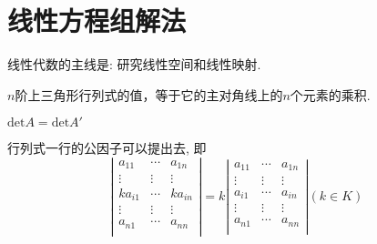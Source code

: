 \section{线性方程组解法}


\begin{Note}
线性代数的主线是: 研究线性空间和线性映射.
\end{Note}

\begin{Proposition}
$n$阶上三角形行列式的值，等于它的主对角线上的$n$个元素的乘积.
\end{Proposition}

\begin{Property}
$\mathrm{det}A = \mathrm{det}A'$
\end{Property}

\begin{Property}
行列式一行的公因子可以提出去, 即
$$
\left| \begin{matrix}
a_{11} & \cdots & a_{1n} \\
\vdots & \vdots & \vdots \\
ka_{i1} &\cdots & k a_{in} \\
\vdots & \vdots & \vdots \\
a_{n1} & \cdots & a_{nn} \\
\end{matrix} \right| = k \left|
\begin{matrix}
a_{11} & \cdots & a_{1n} \\
\vdots & \vdots & \vdots \\
a_{i1} & \cdots & a_{in} \\
\vdots & \vdots & \vdots \\
a_{n1} & \cdots & a_{nn} \\
\end{matrix} \right| (k \in K)$$
\end{Property}


